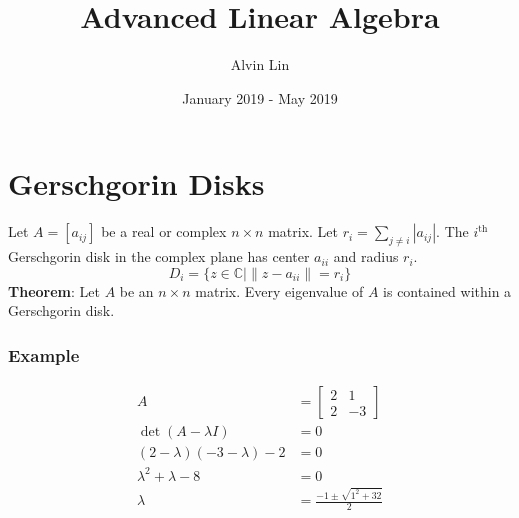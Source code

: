 \documentclass{math}
\title{Advanced Linear Algebra}
\author{Alvin Lin}
\date{January 2019 - May 2019}
\begin{document}
\maketitle

\section*{Gerschgorin Disks}
Let \( A = [a_{ij}] \) be a real or complex \( n\times n \) matrix. Let
\( r_i = \sum_{j\ne i}|a_{ij}| \). The \( i^{\text{th}} \) Gerschgorin disk
in the complex plane has center \( a_{ii} \) and radius \( r_i \).
\[ D_i = \{z\in\mathbb{C}\mid\|z-a_{ii}\| = r_i\} \]
\textbf{Theorem}: Let \( A \) be an \( n\times n \) matrix. Every eigenvalue of
\( A \) is contained within a Gerschgorin disk.

\subsubsection*{Example}
\begin{align*}
  A &= \begin{bmatrix}2 & 1 \\ 2 & -3\end{bmatrix} \\
  \det(A-\lambda I) &= 0 \\
  (2-\lambda)(-3-\lambda)-2 &= 0 \\
  \lambda^2+\lambda-8 &= 0 \\
  \lambda &= \frac{-1\pm\sqrt{1^2+32}}{2}
\end{align*}
\begin{center}
\end{center}
\end{document}
